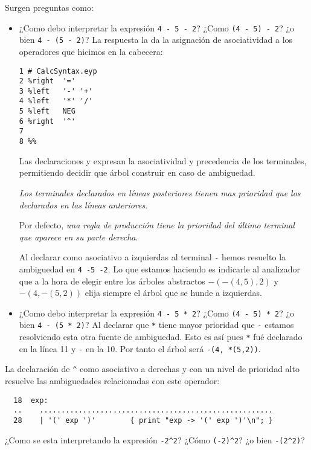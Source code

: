 Surgen preguntas como:

\begin{itemize}
\item
¿Como debo interpretar la expresión \verb|4 - 5 - 2|?
¿Como \verb|(4 - 5) - 2|? ¿o bien \verb|4 - (5 - 2)|?
La respuesta la da la asignación de asociatividad a los operadores
que hicimos en la cabecera:
\begin{verbatim}
1 # CalcSyntax.eyp
2 %right  '='
3 %left   '-' '+'
4 %left   '*' '/'
5 %left   NEG
6 %right  '^'
7
8 %%
\end{verbatim}


Las declaraciones  y  expresan la asociatividad
y precedencia de los terminales, permitiendo decidir que árbol construir 
en caso de  ambiguedad. 

\emph{ Los terminales declarados en líneas 
posteriores tienen mas prioridad que los declarados en las líneas anteriores}.

Por defecto, \emph{una regla de producción
tiene la prioridad del último terminal que aparece
en su parte derecha}.

Al declarar como asociativo a izquierdas al terminal \verb|-| 
hemos 
resuelto la ambiguedad en \verb|4 -5 -2|. Lo que estamos haciendo es
indicarle al analizador que a la hora de elegir entre 
los árboles abstractos 
$-(-(4,5),2)$ y $-(4, -(5,2))$ elija siempre
el árbol que se hunde a izquierdas.
\item
¿Como debo interpretar la expresión \verb|4 - 5 * 2|?
¿Como \verb|(4 - 5) * 2|? ¿o bien \verb|4 - (5 * 2)|?
Al declarar que \verb|*| tiene mayor prioridad que \verb|-| estamos
resolviendo esta otra fuente de ambiguedad. Esto es así pues
\verb|*| fué declarado en la línea 11 y \verb|-| en la 10.
Por tanto el árbol será \verb|-(4, *(5,2))|.
\end{itemize}

La declaración de \verb|^| como asociativo a derechas y con un nivel
de prioridad alto resuelve las ambiguedades relacionadas 
con este operador:

\begin{verbatim}
  18  exp:
  ..    ......................................................
  28    | '(' exp ')'        { print "exp -> '(' exp ')'\n"; }

\end{verbatim}

\begin{exercise}
¿Como se esta interpretando la expresión \verb|-2^2|?
¿Cómo \verb|(-2)^2|? ¿o bien  \verb|-(2^2)|? 
\end{exercise}

